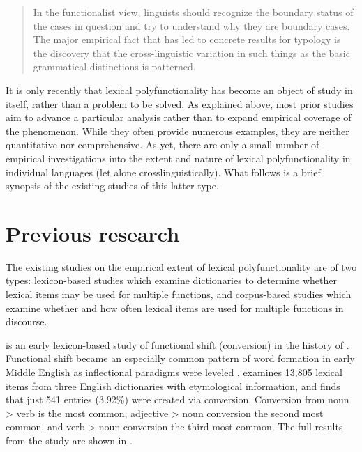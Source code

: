 \blockquote[{\cite[23]{Croft1991}}]{In the functionalist view, linguists should recognize the boundary status of the cases in question and try to understand why they are boundary cases. The major empirical fact that has led to concrete results for typology is the discovery that the cross-linguistic variation in such things as the basic grammatical distinctions is patterned.}

It is only recently that lexical polyfunctionality has become an object of study in itself, rather than a problem to be solved. As explained above, most prior studies aim to advance a particular analysis rather than to expand empirical coverage of the phenomenon. While they often provide numerous examples, they are neither quantitative nor comprehensive. As yet, there are only a small number of empirical investigations into the extent and nature of lexical polyfunctionality in individual languages (let alone crosslinguistically). What follows is a brief synopsis of the existing studies of this latter type.

\section{Previous research}
\label{sec:1.2}

The existing studies on the empirical extent of lexical polyfunctionality are of two types: lexicon-based studies which examine dictionaries to determine whether lexical items may be used for multiple functions, and corpus-based studies which examine whether and how often lexical items are used for multiple functions in discourse.

\textcite{Cannon1985} is an early lexicon-based study of functional shift (conversion) in the history of . Functional shift became an especially common pattern of word formation in early Middle English as inflectional paradigms were leveled \parencite[414]{Cannon1985}. \citeauthor{Cannon1985} examines 13,805 lexical items from three English dictionaries with etymological information, and finds that just 541 entries (3.92\%) were created via conversion. Conversion from noun > verb is the most common, adjective > noun conversion the second most common, and verb > noun conversion the third most common. The full results from the study are shown in .

